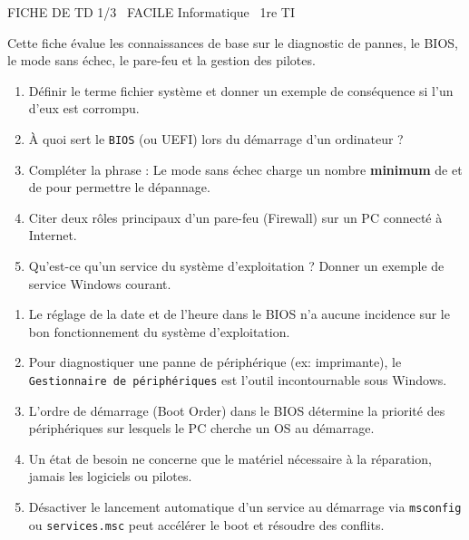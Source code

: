 \documentclass[11pt]{article}
\begin{document}
\begin{tcolorbox}[enhanced,colback=popink,colframe=popink,arc=10pt,boxrule=0pt,left=12pt,right=12pt,top=9pt,bottom=9pt]
{\color{white}\popxbold\small FICHE DE TD 1/3 \textbullet\ FACILE \hfill Informatique \textbullet\ 1re TI\par}
\end{tcolorbox}
\vspace{4pt}
Cette fiche évalue les connaissances de base sur le diagnostic de pannes, le BIOS, le mode sans échec, le pare-feu et la gestion des pilotes.

\begin{exercice}
\begin{enumerate}
    \item Définir le terme \og fichier système \fg{} et donner un exemple de conséquence si l'un d'eux est corrompu.
    \item À quoi sert le \texttt{BIOS} (ou UEFI) lors du démarrage d'un ordinateur ?
    \item Compléter la phrase : Le \og mode sans échec \fg{} charge un nombre \textbf{minimum} de \underline{\hspace{4cm}} et de \underline{\hspace{4cm}} pour permettre le dépannage.
    \item Citer deux rôles principaux d'un \og pare-feu (Firewall) \fg{} sur un PC connecté à Internet.
    \item Qu'est-ce qu'un \og service du système d'exploitation \fg{} ? Donner un exemple de service Windows courant.
\end{enumerate}
\end{exercice}

\begin{exercice}
\begin{enumerate}
    \item Le réglage de la date et de l'heure dans le BIOS n'a aucune incidence sur le bon fonctionnement du système d'exploitation.
    \item Pour diagnostiquer une panne de périphérique (ex: imprimante), le \texttt{Gestionnaire de périphériques} est l'outil incontournable sous Windows.
    \item L'ordre de démarrage (Boot Order) dans le BIOS détermine la priorité des périphériques sur lesquels le PC cherche un OS au démarrage.
    \item Un \og état de besoin \fg{} ne concerne que le matériel nécessaire à la réparation, jamais les logiciels ou pilotes.
    \item Désactiver le lancement automatique d'un service au démarrage via \texttt{msconfig} ou \texttt{services.msc} peut accélérer le boot et résoudre des conflits.
\end{enumerate}
\end{exercice}
\end{document}
